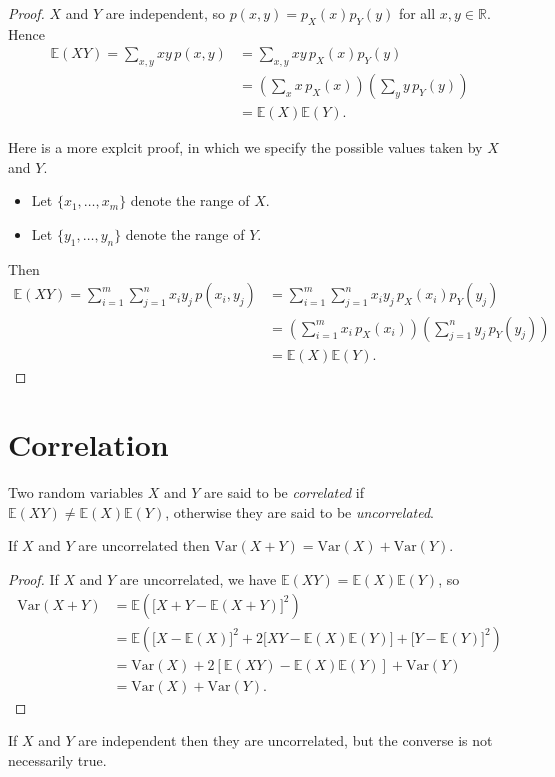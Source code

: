 \documentclass[lecture]{csm}
\newcommand{\R}{\mathbb{R}}
\newcommand{\expe}{\mathbb{E}}
\newcommand{\var}{\text{Var}}
\def\it{\item}
\def\bit{\begin{itemize}}
\def\eit{\end{itemize}}
\begin{document}
\begin{proof}
$X$ and $Y$ are independent, so $p(x,y)=p_X(x)p_Y(y)$ for all $x,y\in\R$.
Hence
\begin{align*}
\expe(XY) = \sum_{x,y} xy\, p(x,y)
	& = \sum_{x,y} xy\, p_X(x)p_Y(y) \\
	& = \left(\sum_x x\, p_X(x)\right)\left(\sum_y y\, p_Y(y)\right) \\
	& = \expe(X)\expe(Y).
\end{align*}

\newpage
Here is a more explcit proof, in which we specify the possible values taken by $X$ and $Y$.
\bit
\it Let $\{x_1,\ldots,x_m\}$ denote the range of $X$.
\it Let $\{y_1,\ldots,y_n\}$ denote the range of $Y$. 
\eit
Then
\begin{align*}
\expe(XY) 
	= \sum_{i=1}^m\sum_{j=1}^n x_i y_j \, p(x_i,y_j) 
	& = \sum_{i=1}^m\sum_{j=1}^n x_i y_j \, p_X(x_i)p_Y(y_j) \\
	& = \left(\sum_{i=1}^m x_i \, p_X(x_i)\right)\left(\sum_{j=1}^n y_j \, p_Y(y_j)\right) \\
	& = \expe(X)\expe(Y).
\end{align*}
\end{proof}

\section{Correlation}

\begin{definition} 
Two random variables $X$ and $Y$ are said to be \emph{correlated} if $\expe(XY)\neq\expe(X)\expe(Y)$, otherwise they are said to be \emph{uncorrelated}.
\end{definition}

\begin{theorem}\label{thm:properties_of_variance}
If $X$ and $Y$ are uncorrelated then $\var(X+Y) = \var(X) + \var(Y)$.
\end{theorem}

\begin{proof}
If $X$ and $Y$ are uncorrelated, we have $\expe(XY)=\expe(X)\expe(Y)$, so
\begin{align*}
\var(X+Y)	& = \expe\left(\big[X+Y - \expe(X+Y)\big]^2\right) \\
			& = \expe\left(\big[X-\expe(X)\big]^2 + 2\big[XY-\expe(X)\expe(Y)\big] + \big[Y-\expe(Y)\big]^2\right) \\
			& = \var(X) + 2\left[\expe(XY)-\expe(X)\expe(Y)\right] + \var(Y) \\
			& = \var(X) + \var(Y).
\end{align*}
\vspace*{-3ex}
\end{proof}
\begin{remark}
If $X$ and $Y$ are independent then they are uncorrelated, but the converse is not necessarily true.
\end{remark}
\end{document}
